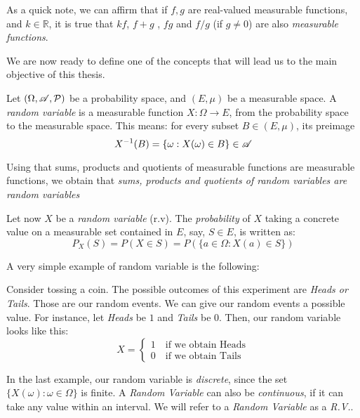 As a quick note, we can affirm that if $f,g$ are real-valued measurable functions, and $k \in \mathbb R$, it is true that $kf$, $f+g$ , $fg$ and $f/g$ (if $g \ne 0$) are also \emph{measurable functions}.

We are now ready to define one of the concepts that will lead us to the main objective of this thesis.

\begin{ndef}
Let $(\Omega,\mathscr{A},\mathcal{P})$ be a probability space, and $(E,\mu)$ be a measurable space. 
A \emph{random variable} is a measurable function $X: \Omega \to E$, from the probability space to the measurable space. This means: for every subset $B \in (E,\mu)$, its preimage
$$
X^{-1}(B) = \{\omega : X(\omega) \in B\} \in \mathscr{A}
$$
\end{ndef}

Using that sums, products and quotients of measurable functions are measurable functions, we obtain that \emph{sums, products and quotients of random variables are random variables}

Let now $X$ be a \emph{random variable} (r.v). The \emph{probability} of $X$ taking a concrete value on a measurable set contained in $E$, say, $S \in E$, is written as:
$$
P_X(S) = P(X \in S) = P(\{a \in \Omega : X(a) \in S\})
$$

A very simple example of random variable is the following:

\begin{nexample}
  Consider tossing a coin. The possible outcomes of this experiment are \emph{Heads or Tails}. Those are our random events. We can give our random events a possible value. For instance, let \emph{Heads} be $1$ and \emph{Tails} be 0. Then, our random variable looks like this:
  \begin{equation*}
      X  = \left\{ \begin{aligned}
  1 \quad \text{if we obtain Heads} \\
  0 \quad \text{if we obtain Tails}
\end{aligned}\right.
  \end{equation*}

\end{nexample}

In the last example, our random variable is \emph{discrete}, since the set $\{X(\omega): \omega \in \Omega\}$ is finite. A \emph{Random Variable} can also be \emph{continuous}, if it can take any value within an interval.
We will refer to a \emph{Random Variable} as a \emph{R.V.}. \\

